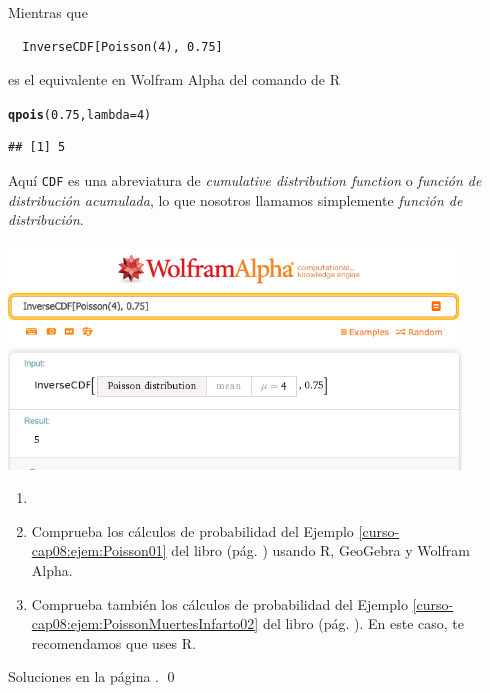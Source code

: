 \documentclass[10pt,a4paper]{article}\usepackage[]{graphicx}\usepackage[]{color}
\makeatletter
\newcommand{\hlnum}[1]{\textcolor[rgb]{0.686,0.059,0.569}{#1}}%
\newcommand{\hlstd}[1]{\textcolor[rgb]{0.345,0.345,0.345}{#1}}%
\newcommand{\hlkwc}[1]{\textcolor[rgb]{0.333,0.667,0.333}{#1}}%
\newcommand{\hlkwd}[1]{\textcolor[rgb]{0.737,0.353,0.396}{\textbf{#1}}}%
\newenvironment{kframe}{%
 \def\at@end@of@kframe{}%
 \ifinner\ifhmode%
  \def\at@end@of@kframe{\end{minipage}}%
  \begin{minipage}{\columnwidth}%
 \fi\fi%
 \def\FrameCommand##1{\hskip\@totalleftmargin \hskip-\fboxsep
 \colorbox{shadecolor}{##1}\hskip-\fboxsep
     \hskip-\linewidth \hskip-\@totalleftmargin \hskip\columnwidth}%
 \MakeFramed {\advance\hsize-\width
   \@totalleftmargin\z@ \linewidth\hsize
   \@setminipage}}%
 {\par\unskip\endMakeFramed%
 \at@end@of@kframe}
\newenvironment{knitrout}{}{} %
\makeatother
\begin{document}
Mientras que
\begin{verbatim}
  InverseCDF[Poisson(4), 0.75]
\end{verbatim}
es el equivalente en Wolfram Alpha del comando de R
\begin{knitrout}
\color{fgcolor}\begin{kframe}
\begin{alltt}
\hlkwd{qpois}\hlstd{(}\hlnum{0.75}\hlstd{,} \hlkwc{lambda}\hlstd{=}\hlnum{4}\hlstd{)}
\end{alltt}
\begin{verbatim}
## [1] 5
\end{verbatim}
\end{kframe}
\end{knitrout}
Aquí {\tt CDF} es una abreviatura de {\em cumulative distribution function} o {\em función de distribución acumulada}, lo que nosotros llamamos simplemente {\em función de distribución}.

\begin{center}
    \includegraphics[width=12cm]{../fig/Tut08-04.png}
\end{center}

\begin{ejercicio}
\label{tut08:ejercicio04}
\begin{enumerate}
  \item[]
  \item Comprueba los cálculos de probabilidad del Ejemplo \ref{curso-cap08:ejem:Poisson01} del libro (pág. \pageref{curso-cap08:ejem:Poisson01}) usando R, GeoGebra y Wolfram Alpha.
  \item  Comprueba también los cálculos de probabilidad del Ejemplo \ref{curso-cap08:ejem:PoissonMuertesInfarto02} del libro (pág. \pageref{curso-cap08:ejem:PoissonMuertesInfarto02}). En este caso, te recomendamos que uses R.
\end{enumerate}
Soluciones en la página \pageref{tut08:ejercicio04:sol}.
\qed
\end{ejercicio}
\end{document}
